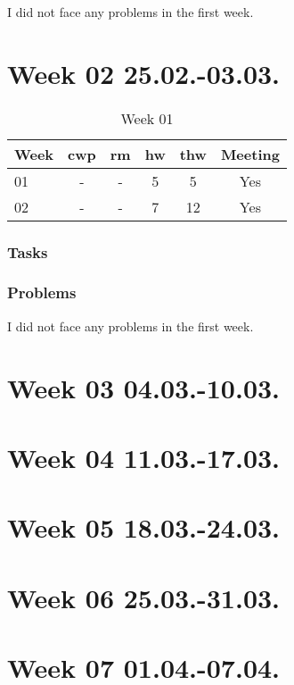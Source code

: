 I did not face any problems in the first week.

\section{Week 02 25.02.-03.03.}
\label{sec:journal:week02}

\begin{table}[!ht]
    \begin{center}
        \caption{Week 01}
        \label{tab:journal:week01}
        \begin{tabular}{l|c|c|c|c|c}
            \textbf{Week} & \textbf{\gls{cwp}} & \textbf{\gls{rm}} & \textbf{\gls{hw}} & \textbf{\gls{thw}} & \textbf{Meeting}\\
        \hline
            01  & - & - & 5 & 5 & Yes \\
            02  & - & - & 7 & 12 & Yes \\
        \end{tabular}
    \end{center}
\end{table}

\subsubsection{Tasks}



\subsubsection{Problems}

I did not face any problems in the first week.
\section{Week 03 04.03.-10.03.}
\label{sec:journal:week03}
\section{Week 04 11.03.-17.03.}
\label{sec:journal:week04}
\section{Week 05 18.03.-24.03.}
\label{sec:journal:week05}
\section{Week 06 25.03.-31.03.}
\label{sec:journal:week06}
\section{Week 07 01.04.-07.04.}
\label{sec:journal:week07}
